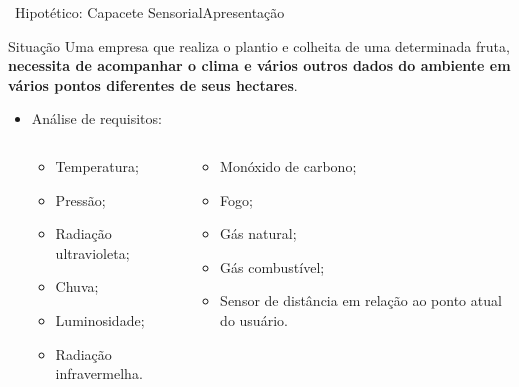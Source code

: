 
   \begin{frame}{\Wearable\ Hipotético: Capacete Sensorial}{Apresentação}
      \begin{block}{Situação}
         Uma empresa que realiza o plantio e colheita de uma determinada fruta, \textbf{necessita de acompanhar o clima e vários outros dados do ambiente em vários pontos diferentes de seus hectares}.
      \end{block}
      
         \bigskip
   
      \begin{itemize}
         \item Análise de requisitos:
         \begin{columns}
            \begin{column}{0.37\textwidth}
               \begin{itemize}
                  \item Temperatura;
                  \item Pressão;
                  \item Radiação ultravioleta;
                  \item Chuva;
                  \item Luminosidade;
                  \item Radiação infravermelha.
               \end{itemize}
            \end{column}
            \begin{column}{0.37\textwidth}
               \begin{itemize}
                  \item Monóxido de carbono;
                  \item Fogo;
                  \item Gás natural;
                  \item Gás combustível;
                  \item Sensor de distância em relação ao ponto atual do usuário.
               \end{itemize}
            \end{column}
         \end{columns}
      \end{itemize}
   \end{frame}

